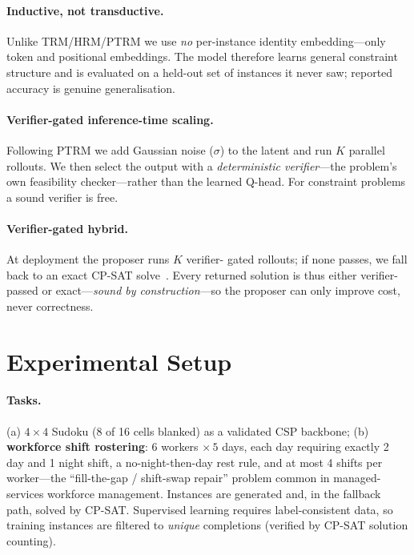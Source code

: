\documentclass{article}
\begin{document}
\paragraph{Inductive, not transductive.} Unlike TRM/HRM/PTRM we use \emph{no}
per-instance identity embedding---only token and positional embeddings. The model
therefore learns general constraint structure and is evaluated on a held-out set
of instances it never saw; reported accuracy is genuine generalisation.

\paragraph{Verifier-gated inference-time scaling.} Following PTRM we add Gaussian
noise ($\sigma$) to the latent and run $K$ parallel rollouts. We then select the
output with a \emph{deterministic verifier}---the problem's own feasibility
checker---rather than the learned Q-head. For constraint problems a sound verifier
is free.

\paragraph{Verifier-gated hybrid.} At deployment the proposer runs $K$ verifier-
gated rollouts; if none passes, we fall back to an exact CP-SAT
solve~\cite{ortools}. Every returned solution is thus either verifier-passed or
exact---\emph{sound by construction}---so the proposer can only improve cost, never
correctness.

\section{Experimental Setup}

\paragraph{Tasks.} (a) $4\times4$ Sudoku (8 of 16 cells blanked) as a validated CSP
backbone; (b) \textbf{workforce shift rostering}: $6$ workers $\times\,5$ days,
each day requiring exactly 2 day and 1 night shift, a no-night-then-day rest rule,
and at most 4 shifts per worker---the ``fill-the-gap / shift-swap repair'' problem
common in managed-services workforce management. Instances are generated and, in
the fallback path, solved by CP-SAT. Supervised learning requires label-consistent
data, so training instances are filtered to \emph{unique} completions (verified by
CP-SAT solution counting).
\end{document}
